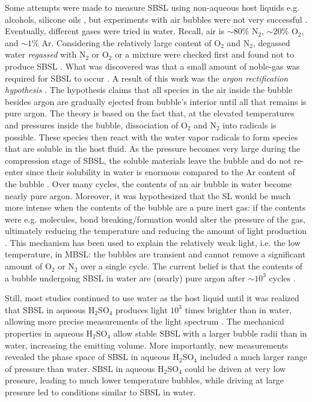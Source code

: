\documentclass[11pt,prb,aps,nofootinbib,superscriptaddress,floatfix]{revtex4-2}
\begin{document}
Some attempts were made to measure SBSL using non-aqueous host liquids e.g. alcohols, silicone oils \cite{weninger1995sonoluminescence,barber1997defining}, but experiments with air bubbles were not very successful \cite{barber1997defining}. Eventually, different gases were tried in water. Recall, air is $\sim 80\%$ N$_2$, $\sim 20\%$ O$_2$, and $\sim 1\% $ Ar. Considering the relatively large content of O$_2$ and N$_2$, degassed water \emph{regassed} with N$_2$ or O$_2$ or a mixture were checked first and found not to produce SBSL \cite{hiller1994effect}. What was discovered was that a small amount of noble-gas was required for SBSL to occur \cite{barber1997defining,hiller1994effect,brenner2002single}. A result of this work was the \emph{argon rectification hypothesis} \cite{lohse1997sonoluminescing,brenner2002single,yasui2018acoustic,suslick2008inside}. The hypothesis claims that all species in the air inside the bubble besides argon are gradually ejected from bubble's interior until all that remains is pure argon. The theory is based on the fact that, at the elevated temperatures and pressures inside the bubble, dissociation of O$_2$ and N$_2$ into radicals is possible. These species then react with the water vapor radicals to form species that are soluble in the host fluid. As the pressure becomes very large during the compression stage of SBSL, the soluble materials leave the bubble and do not re-enter since their solubility in water is enormous compared to the Ar content of the bubble \cite{lohse1997sonoluminescing}. Over many cycles, the contents of an air bubble in water become nearly pure argon. Moreover, it was hypothesized that the SL would be much more intense when the contents of the bubble are a pure inert gas: if the contents were e.g. molecules, bond breaking/formation would alter the pressure of the gas, ultimately reducing the temperature and reducing the amount of light production \cite{brenner2002single,yasui2018acoustic,lohse2018bubble,suslick2008inside}. This mechanism has been used to explain the relatively weak light, i.e. the low temperature, in MBSL: the bubbles are transient and cannot remove a significant amount of O$_2$ or N$_2$ over a single cycle. The current belief is that the contents of a bubble undergoing SBSL in water are (nearly) pure argon after $\sim 10^3$ cycles \cite{brenner2002single,yasui2018acoustic}.  

Still, most studies continued to use water as the host liquid until it was realized that SBSL in aqueous H$_2$SO$_4$ produces light $10^3$ times brighter than in water, allowing more precise measurements of the light spectrum \cite{flannigan2005plasma,flannigan2006measurement}. The mechanical properties in aqueous H$_2$SO$_4$ allow stable SBSL with a larger bubble radii than in water, increasing the emitting volume. More importantly, new measurements revealed the phase space of SBSL in aqueous H$_2$SO$_4$ included a much larger range of pressure than water. SBSL in aqueous H$_2$SO$_4$ could be driven at very low pressure, leading to much lower temperature bubbles, while driving at large pressure led to conditions similar to SBSL in water. 
\end{document}

